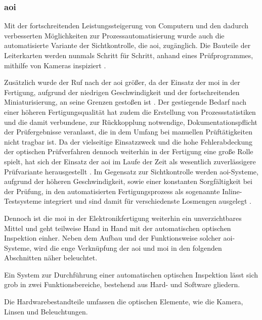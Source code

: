 \subsubsection{\acl{aoi}}
    Mit der fortschreitenden Leistungssteigerung von Computern und den dadurch verbesserten Möglichkeiten zur Prozessautomatisierung wurde auch die automatisierte Variante der Sichtkontrolle, die \ac{aoi}, zugänglich.
    Die Bauteile der Leiterkarten werden nunmals Schritt für Schritt, anhand eines Prüfprogrammes, mithilfe von Kameras inspiziert \cite{neumann_mut_2014}.
    
    Zusätzlich wurde der Ruf nach der \ac{aoi} größer, da der Einsatz der \ac{moi} in der Fertigung, aufgrund der niedrigen Geschwindigkeit und der fortschreitenden Miniaturisierung, an seine Grenzen gestoßen ist \cite{berger_test-_2012}.
    Der gestiegende Bedarf nach einer höheren Fertigungsqualität hat zudem die Erstellung von Prozessstatistiken und die damit verbundene, zur Rückkopplung notwendige, Dokumentationspflicht der Prüfergebnisse veranlasst, die in dem Umfang bei manuellen Prüftätigkeiten nicht tragbar ist.
    Da der vielseitige Einsatzzweck und die hohe Fehlerabdeckung der optischen Prüfverfahren dennoch weiterhin in der Fertigung eine große Rolle spielt, hat sich der Einsatz der \ac{aoi} im Laufe der Zeit als wesentlich zuverlässigere Prüfvariante herausgestellt \cite{berger_test-_2012}. 
    Im Gegensatz zur Sichtkontrolle werden \ac{aoi}-Systeme, aufgrund der höheren Geschwindigkeit, sowie einer konstanten Sorgfältigkeit bei der Prüfung, in den automatisierten Fertigungsprozess als sogenannte Inline-Testsysteme integriert und sind damit für verschiedenste Losmengen ausgelegt \cite{berger_test-_2012} \cite{stiny_fertigung_2010}.
    
    Dennoch ist die \ac{moi} in der Elektronikfertigung weiterhin ein unverzichtbares Mittel und geht teilweise Hand in Hand mit der automatischen optischen Inspektion einher.
    Neben dem Aufbau und der Funktionsweise solcher \ac{aoi}-Systeme, wird die enge Verknüpfung der \ac{aoi} und \ac{moi} in den folgenden Abschnitten näher beleuchtet.

        Ein System zur Durchführung einer automatischen optischen Inspektion lässt sich grob in zwei Funktionsbereiche, bestehend aus Hard- und Software gliedern.

        Die Hardwarebestandteile umfassen die optischen Elemente, wie die Kamera, Linsen und Beleuchtungen.

